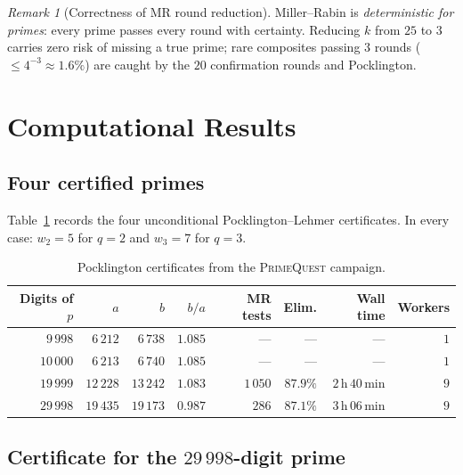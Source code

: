 \documentclass[11pt,a4paper]{article}
\theoremstyle{definition}
\theoremstyle{remark}
\newtheorem{remark}[theorem]{Remark}
\begin{document}
\begin{remark}[Correctness of MR round reduction]
Miller--Rabin is \emph{deterministic for primes}: every prime passes every
round with certainty. Reducing $k$ from $25$ to $3$ carries zero risk of
missing a true prime; rare composites passing $3$ rounds ($\leq 4^{-3}
\approx 1.6\%$) are caught by the $20$ confirmation rounds and Pocklington.
\end{remark}

\section{Computational Results}\label{sec:results}

\subsection{Four certified primes}

\begin{resultbox}
Table~\ref{tab:results} records the four unconditional
Pocklington--Lehmer certificates. In every case: $w_2=5$ for $q=2$
and $w_3=7$ for $q=3$.
\end{resultbox}

\begin{table}[ht]\centering
\caption{Pocklington certificates from the \textsc{PrimeQuest} campaign.}
\label{tab:results}
\begin{tabular}{@{}rrrrrrrr@{}}
\toprule
Digits of $p$ & $a$ & $b$ & $b/a$ & MR tests & Elim. & Wall time & Workers \\
\midrule
$9\,998$  & $6\,212$  & $6\,738$  & $1.085$ & ---      & ---    & ---            & $1$ \\
$10\,000$ & $6\,213$  & $6\,740$  & $1.085$ & ---      & ---    & ---            & $1$ \\
$19\,999$ & $12\,228$ & $13\,242$ & $1.083$ & $1\,050$ & $87.9\%$ & $2$\,h\,$40$\,min & $9$ \\
$29\,998$ & $19\,435$ & $19\,173$ & $0.987$ & $286$    & $87.1\%$ & $3$\,h\,$06$\,min & $9$ \\
\bottomrule
\end{tabular}
\end{table}

\subsection{Certificate for the $29\,998$-digit prime}
\end{document}
